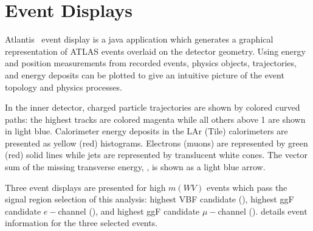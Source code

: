 \chapter{Event Displays}
\label{ch:eventDisplay}

Atlantis~\cite{Atlantis} event display is a java application which generates a graphical representation of ATLAS events overlaid on the detector geometry. Using energy and position measurements from recorded events, physics objects, trajectories, and energy deposits can be plotted to give an intuitive picture of the event topology and physics processes. 

In the inner detector, charged particle trajectories are shown by colored curved paths: the highest \pt tracks are colored magenta while all others above 1 \pt are shown in light blue. Calorimeter energy deposits in the LAr (Tile) calorimeters are presented as yellow (red) histograms. Electrons (muons) are represented by green (red) solid lines while jets are represented by translucent white cones. The vector sum of the missing transverse energy, \MET, is shown as a light blue arrow.

Three event displays are presented for high $m(WV)$ events which pass the signal region selection of this analysis: highest VBF candidate (\Sect{\ref{sec:high_vbf}}), highest ggF candidate $e-$channel (\Sect{\ref{sec:high_ggf_e}}), and highest ggF candidate $\mu-$channel (\Sect{\ref{sec:high_ggf_m}}). \Tab{\ref{tab:ed_stats_zzzz}} details event information for the three selected events.

